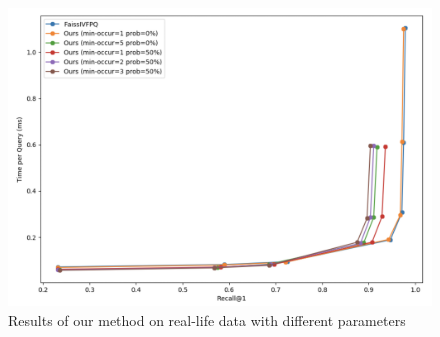 \begin{figure}
    \centering
    \includegraphics[width=\textwidth]{thesis/images/real-life-exp-all-ours.png}
    \caption{Results of our method on real-life data with different parameters }
    \label{fig:reallifeexp-all}
\end{figure}
